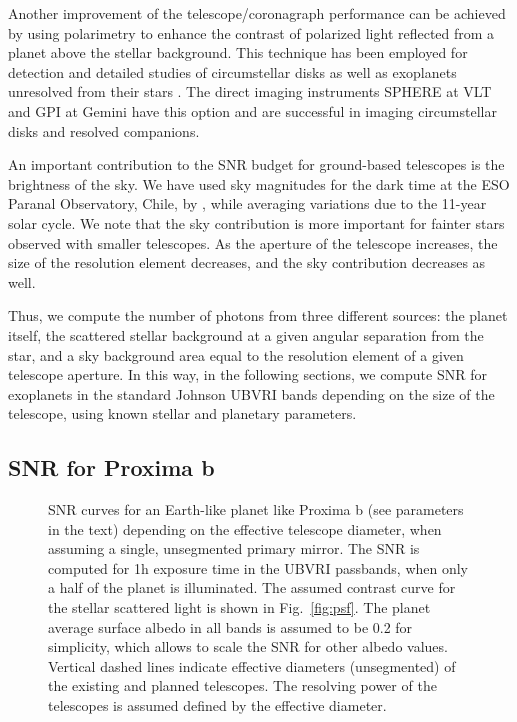 \documentclass{emulateapj}
\begin{document}
Another improvement of the telescope/coronagraph performance can be achieved by
using polarimetry to enhance the contrast of polarized light reflected from a planet above the stellar
background. This technique has been employed for detection and detailed studies of 
circumstellar disks \citep[e.g.,][]{kuhn01,opp08,poldisks_sphere,poldisks_gpi} 
as well as exoplanets unresolved from their stars \citep{berdetal2008,berdetal2011}. 
The direct imaging instruments SPHERE at VLT and GPI at Gemini have this option 
and are successful in imaging circumstellar disks and resolved companions.

An important contribution to the SNR budget for ground-based telescopes 
is the brightness of the sky. We have used sky magnitudes for the dark time at 
the ESO Paranal Observatory, Chile, by \cite{pat08}, while averaging variations due to the
11-year solar cycle. 
We note that the sky contribution is more important 
for fainter stars observed with smaller telescopes. As the aperture of the telescope
increases, the size of the resolution element decreases, and the sky contribution 
decreases as well.

Thus, we compute the number of photons from three different sources: the planet itself, 
the scattered stellar background at a given angular separation from the star, 
and a sky background area equal to the resolution element of a given telescope aperture. 
In this way, in the following sections, we compute SNR for exoplanets 
in the standard Johnson UBVRI bands depending on the size of the telescope,
using known stellar and planetary parameters.

\subsection{SNR for Proxima b}\label{sec:snr}

\begin{figure}
\centering
{}
\caption{
SNR curves for an Earth-like planet like Proxima b 
(see parameters in the text)
depending on the effective telescope diameter, when assuming a single, 
unsegmented primary mirror. The SNR is computed for 1h exposure time in 
the UBVRI passbands, when only a half of the planet is illuminated.
The assumed contrast curve for the stellar scattered light 
is shown in Fig.~\ref{fig:psf}. 
The planet average surface albedo in all bands is assumed to be 0.2 for simplicity,
which allows to scale the SNR for other albedo values.  
Vertical dashed lines indicate effective diameters (unsegmented) of the existing
and planned telescopes. The resolving power of the telescopes is assumed defined
by the effective diameter.
}
\label{fig:prox_snr}
\end{figure}
\end{document}

